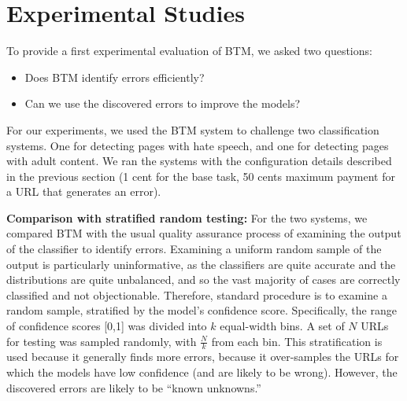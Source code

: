 \section{Experimental Studies}

To provide a first experimental evaluation of BTM, we asked two questions:
\begin{itemize}

\item Does BTM identify errors efficiently?

\item Can we use the discovered errors to improve the models?

\end{itemize}

For our experiments, we used the BTM system to challenge two
classification systems. One for detecting pages with hate speech, and
one for detecting pages with adult content. We ran the systems with
the configuration details described in the previous section (1 cent
for the base task, 50 cents maximum payment for a URL that generates
an error).

\textbf{Comparison with stratified random testing:} For the two systems, we compared BTM with the usual quality assurance process of examining the output of the classifier to identify errors.  Examining a uniform random sample of the output is particularly uninformative, as the classifiers are quite accurate and the distributions are quite unbalanced, and so the vast majority of cases are correctly classified and not objectionable.  Therefore, standard procedure is to examine a random sample, stratified by the model's confidence score.  Specifically, the range of confidence scores [0,1] was divided into $k$ equal-width bins.  A set of $N$ URLs for testing was sampled randomly, with $\frac{N}{k}$ from each bin.  This stratification is used because it generally finds more errors, because it over-samples the URLs for which the models have low confidence (and are likely to be wrong).  However, the discovered errors are likely to be ``known unknowns.''  

